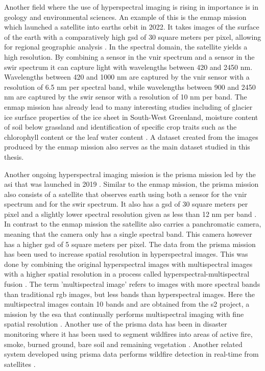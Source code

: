 Another field where the use of hyperspectral imaging is rising in importance is in geology and environmental sciences. An example of this is the \ac{enmap} mission which launched a satellite into earths orbit in 2022. It takes images of the surface of the earth with a comparatively high \ac{gsd} of 30 square meters per pixel, allowing for regional geographic analysis \citep{guanter_enmap_2015}. In the spectral domain, the satellite yields a high resolution. By combining a sensor in the \ac{vnir} spectrum and a sensor in the \ac{swir} spectrum it can capture light with wavelengths between 420 and 2450 nm. Wavelengths between 420 and 1000 nm are captured by the \ac{vnir} sensor with a resolution of 6.5 nm per spectral band, while wavelengths between 900 and 2450 nm are captured by the \ac{swir} sensor with a resolution of 10 nm per band.
The \ac{enmap} mission has already lead to many interesting studies including of glacier ice surface properties of the ice sheet in South-West Greenland, moisture content of soil below grassland and identification of specific crop traits such as the chlorophyll content or the leaf water content \citep{bohn_glacier_2022,pascual-venteo_prototyping_2022,dopper_estimating_2022}.
A dataset created from the images produced by the \ac{enmap} mission also serves as the main dataset studied in this thesis.

Another ongoing hyperspectral imaging mission is the \ac{prisma} mission led by the \ac{asi} that was launched in 2019 \citep{loizzo_prisma_2019}. Similar to the \ac{enmap} mission, the \ac{prisma} mission also consists of a satellite that observes earth using both a sensor for the \ac{vnir} spectrum and for the \ac{swir} spectrum. It also has a \ac{gsd} of 30 square meters per pixel and a slightly lower spectral resolution given as less than 12 nm per band \citep{guarini_overview_2017,guarini_prisma_2018}. In contrast to the \ac{enmap} mission the satellite also carries a panchromatic camera, meaning that the camera only has a single spectral band. This camera however has a higher \ac{gsd} of 5 square meters per pixel. The data from the \ac{prisma} mission has been used to increase spatial resolution in hyperspectral images. This was done by combining the original hyperspectral images with multispectral images with a higher spatial resolution in a process called hyperspectral-multispectral fusion \citep{acito_prisma_2022}. The term 'multispectral image' refers to images with more spectral bands than traditional \ac{rgb} images, but less bands than hyperspectral images. Here the multispectral images contain 10 bands and are obtained from the \ac{s2} project, a mission by the \ac{esa} that continually performs multispectral imaging with fine spatial resolution \citep{drusch_sentinel-2_2012}. Another use of the \ac{prisma} data has been in disaster monitoring where it has been used to segment wildfires into areas of active fire, smoke, burned ground, bare soil and remaining vegetation \citep{spiller_transfer_2022}. Another related system developed using \ac{prisma} data performs wildfire detection in real-time from satellites  \citep{spiller_wildfire_2022}.

